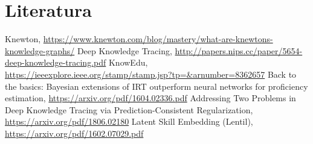 \documentclass{report}
\begin{document}
\chapter{Literatura}
%
\renewcommand{\bibsection}{}
\begin{thebibliography}{9}

 Knewton, \url{https://www.knewton.com/blog/mastery/what-are-knewtons-knowledge-graphs/}
 Deep Knowledge Tracing, \url{ http://papers.nips.cc/paper/5654-deep-knowledge-tracing.pdf}
 KnowEdu, \url{ https://ieeexplore.ieee.org/stamp/stamp.jsp?tp=&arnumber=8362657}
 Back to the basics: Bayesian extensions of IRT outperform
neural networks for proficiency estimation, \url{https://arxiv.org/pdf/1604.02336.pdf}
 Addressing Two Problems in Deep Knowledge Tracing via
Prediction-Consistent Regularization, \url{https://arxiv.org/pdf/1806.02180}
 Latent Skill Embedding (Lentil), \url{https://arxiv.org/pdf/1602.07029.pdf}

\end{thebibliography}
\end{document}

